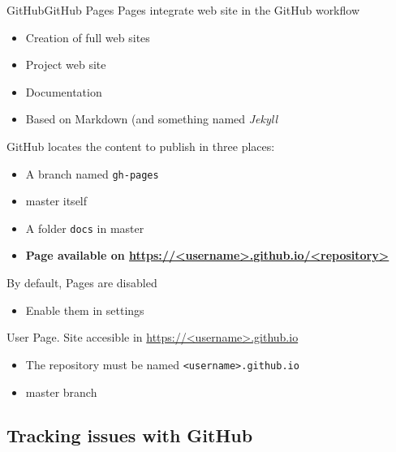 \documentclass[10pt,compress]{beamer} %
\begin{document}
\begin{frame}{GitHub}{GitHub Pages}
	Pages integrate web site in the GitHub workflow
	\begin{itemize}
		\item Creation of full web sites
		\item Project web site
		\item Documentation
		\item Based on Markdown (and something named \textit{Jekyll}
	\end{itemize}

	GitHub locates the content to publish in three places:
	\begin{itemize}
		\item A branch named \texttt{gh-pages}
		\item master itself
		\item A folder \texttt{docs} in master
		\item \textbf{Page available on \url{https://<username>.github.io/<repository>}}
	\end{itemize}

	By default, Pages are disabled 
	\begin{itemize}
		\item Enable them in settings
	\end{itemize}

	User Page. Site accesible in \url{https://<username>.github.io}
	\begin{itemize}
		\item The repository must be named \texttt{<username>.github.io}
		\item master branch
	\end{itemize}
\end{frame}

\subsection{Tracking issues with GitHub}
\end{document}
